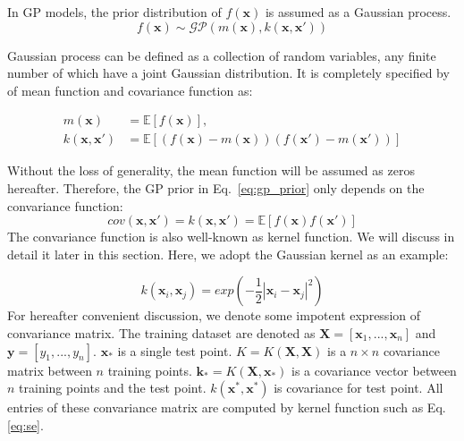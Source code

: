 In GP models, the prior distribution of $f(\mathbf{x})$ is assumed as a Gaussian process.
\begin{equation}
	f(\mathbf{x}) \sim \mathcal{GP}(m(\mathbf{x}),k(\mathbf{x},\mathbf{x}'))
	\label{eq:gp_prior}
\end{equation}

Gaussian process can be defined as a collection of random variables, any finite number of which have a joint Gaussian distribution. It is completely specified by of mean function and covariance function as:

\begin{equation*}
	\begin{aligned}
		m(\mathbf{x}) &= \mathbb{E}[f(\mathbf{x})],\\
		k(\mathbf{x},\mathbf{x}') &= \mathbb{E}[(f(\mathbf{x})-m(\mathbf{x}))(f(\mathbf{x}')-m(\mathbf{x}'))]
	\end{aligned}
\end{equation*}

Without the loss of generality, the mean function will be assumed as zeros hereafter. Therefore, the GP prior in Eq.~\eqref{eq:gp_prior} only depends on the convariance function:
\begin{equation}
	cov(\mathbf{x},\mathbf{x}')=k(\mathbf{x},\mathbf{x}') = \mathbb{E}[f(\mathbf{x})f(\mathbf{x}')]
\end{equation}
The convariance function is also well-known as kernel function. We will discuss in detail it later in this section. Here, we adopt the Gaussian kernel as an example:

\begin{equation}
	k(\mathbf{x}_i,\mathbf{x}_j) = exp(-\frac{1}{2}|\mathbf{x}_i-\mathbf{x}_j|^2)
	\label{eq:se}
\end{equation}
For hereafter convenient discussion, we denote some impotent expression of convariance matrix. The training dataset are denoted as $\mathbf{X} = [\mathbf{x}_1,...,\mathbf{x}_n]$ and $\mathbf{y} = [y_1,...,y_n]$. $\mathbf{x}_*$ is a single test point. $K = K(\mathbf{X},\mathbf{X})$ is a $n\times n$ covariance matrix between $n$ training points. $\mathbf{k}_*= K(\mathbf{X},\mathbf{x}_*)$ is a covariance vector between $n$ training points and the test point. $k(\mathbf{x}^*\mathbf{,x}^*)$ is covariance for test point. All entries of these convariance matrix are computed by kernel function such as Eq.\ref{eq:se}.

